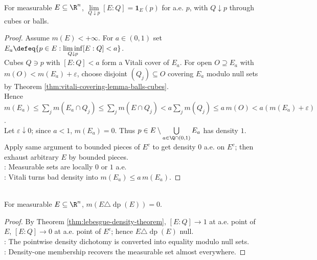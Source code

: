 \begin{theorem} \label{thm:lebesgue-density-theorem} \\
For measurable $E\subseteq\R^n$, $\lim\limits_{Q\downarrow p}[E:Q]=\mathbf{1}_E(p)$ for a.e. $p$, with $Q\downarrow p$ through cubes or balls.
\begin{proof}
Assume $m(E)<+\infty$. For $a\in(0,1)$ set $E_a\defeq\{p\in E:\liminf\limits_{Q\downarrow p}[E:Q]<a\}$.\\
Cubes $Q\ni p$ with $[E:Q]<a$ form a Vitali cover of $E_a$. For open $O\supseteq E_a$ with $m(O)<m(E_a)+\varepsilon$, choose disjoint $(Q_j)\subseteq O$ covering $E_a$ modulo null sets by Theorem \ref{thm:vitali-covering-lemma-balls-cubes}.\\
Hence $m(E_a)\leq\sum\limits_jm(E_a\cap Q_j)\leq\sum\limits_jm(E\cap Q_j)<a\sum\limits_jm(Q_j)\leq a\,m(O)<a(m(E_a)+\varepsilon)$.\\
Let $\varepsilon\downarrow0$; since $a<1$, $m(E_a)=0$. Thus $p\in E\setminus\bigcup\limits_{a\in\Q\cap(0,1)}E_a$ has density $1$. Apply same argument to bounded pieces of $E^c$ to get density $0$ a.e. on $E^c$; then exhaust arbitrary $E$ by bounded pieces.\\
: Measurable sets are locally $0$ or $1$ a.e.\\
: Vitali turns bad density into $m(E_a)\le a\,m(E_a)$.
\end{proof}
\end{theorem}

\begin{corollary} \label{cor:density-points-represent-measurable-set} \\
For measurable $E\subseteq\R^n$, $m(E\triangle\operatorname{dp}(E))=0$.
\begin{proof} By Theorem \ref{thm:lebesgue-density-theorem}, $[E:Q]\to1$ at a.e. point of $E$, $[E:Q]\to0$ at a.e. point of $E^c$; hence $E\triangle\operatorname{dp}(E)$ null.\\
: The pointwise density dichotomy is converted into equality modulo null sets.\\
: Density-one membership recovers the measurable set almost everywhere.
\end{proof}
\end{corollary}

